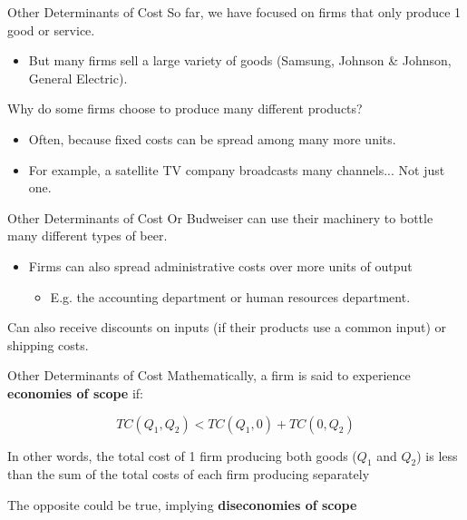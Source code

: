\documentclass[11pt,t]{beamer}
\begin{document}
\begin{frame}{Other Determinants of Cost}
  So far, we have focused on firms that only produce 1 good or service.

  \begin{itemize}
    \item But many firms sell a large variety of goods (Samsung, Johnson \& Johnson, General Electric).
  \end{itemize}

  \bigskip\pause
  Why do some firms choose to produce many different products?
  \begin{itemize}    
    \item Often, because fixed costs can be spread among many more units.
    
    \item For example, a satellite TV company broadcasts many channels... Not just one.
  \end{itemize}
\end{frame}

\begin{frame}{Other Determinants of Cost}
  Or Budweiser can use their machinery to bottle many different types of beer.

  \begin{itemize}
    \item Firms can also spread administrative costs over more units of output
    \begin{itemize}
      \item E.g. the accounting department or human resources department.
    \end{itemize}
  \end{itemize}

  Can also receive discounts on inputs (if their products use a common input) or shipping costs.
\end{frame}

\begin{frame}{Other Determinants of Cost}
  Mathematically, a firm is said to experience \textbf{economies of scope} if:

  $$
    TC(Q_1,Q_2) < TC(Q_1,0) + TC(0, Q_2)
  $$

  \bigskip
  In other words, the total cost of 1 firm producing both goods ($Q_1$ and $Q_2$) is less than the sum of the total costs of each firm producing separately

  \pause\bigskip
  The opposite could be true, implying \textbf{diseconomies of scope}
\end{frame}
\end{document}
